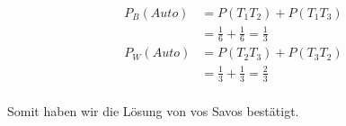\begin{align*}
    P_B(Auto) & = P(T_1T_2) + P(T_1T_3)                   \\
              & = \frac{1}{6} + \frac{1}{6} = \frac{1}{3} \\
    P_W(Auto) & = P(T_2T_3) + P(T_3T_2)                   \\
              & = \frac{1}{3} + \frac{1}{3} = \frac{2}{3} \\
\end{align*}

Somit haben wir die Lösung von vos Savos bestätigt.


